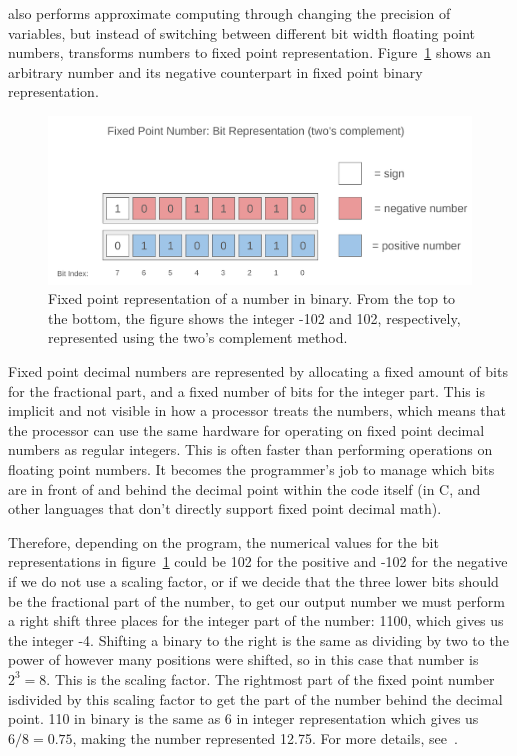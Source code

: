 \taffo{} also performs approximate computing through changing the precision of variables, but instead of switching between different bit width floating point numbers, \taffo{} transforms numbers to fixed point representation. Figure~\ref{fig:fixed_point_representation} shows an arbitrary number and its negative counterpart in fixed point binary representation.

\begin{figure}
    \centering
    \includegraphics[width=0.75\linewidth]{Images/fixed_point_bit_representation.png}
    \caption{Fixed point representation of a number in binary. From the top to the bottom, the figure shows the integer -102 and 102, respectively, represented using the two's complement method.}
    \label{fig:fixed_point_representation}
\end{figure}

Fixed point decimal numbers are represented by allocating a fixed amount of bits for the fractional part, and a fixed number of bits for the integer part. This is implicit and not visible in how a processor treats the numbers, which means that the processor can use the same hardware for operating on fixed point decimal numbers as regular integers. This is often faster than performing operations on floating point numbers. It becomes the programmer's job to manage which bits are in front of and behind the decimal point within the code itself (in C, and other languages that don't directly support fixed point decimal math). 



Therefore, depending on the program, the numerical values for the bit representations in figure~\ref{fig:fixed_point_representation} could be 102 for the positive and -102 for the negative if we do not use a scaling factor, or if we decide that the three lower bits should be the fractional part of the number, to get our output number we must perform a right shift three places for the integer part of the number: 1100, which gives us the integer -4. Shifting a binary to the right is the same as dividing by two to the power of however many positions were shifted, so in this case that number is $2^3 = 8$. This is the scaling factor. The rightmost part of the fixed point number isdivided by this scaling factor to get the part of the number behind the decimal point. 110 in binary is the same as 6 in integer representation which gives us $6/8 = 0.75$, making the number represented 12.75. For more details, see~\citet{yates2009fixed}.

